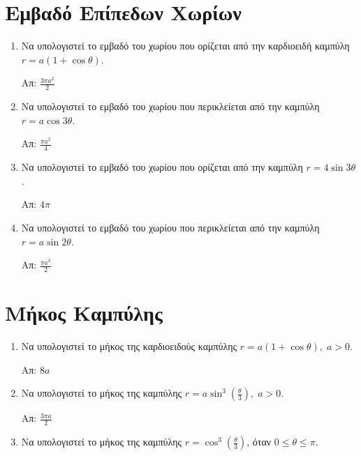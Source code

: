 


\everymath{\displaystyle}

\thispagestyle{askhseis}


\begin{center}
  \minibox{\large\bfseries \textcolor{Col1}{Πολικές Καμπύλες}}
\end{center}

\vspace{\baselineskip}


\section*{Εμβαδό Επίπεδων Χωρίων}

\begin{enumerate}
  \item Να υπολογιστεί το εμβαδό του χωρίου που ορίζεται από την καρδιοειδή καμπύλη
    $ r = a(1  + \cos{\theta}) $.

    \hfill Απ: $ \frac{3\pi a^{2}}{2} $

  \item Να υπολογιστεί το εμβαδό του χωρίου που περικλείεται από την καμπύλη $
    r = a \cos{3\theta} $.

    \hfill Απ: $ \frac{\pi a^{2}}{4} $

  \item Να υπολογιστεί το εμβαδό του χωρίου που ορίζεται από την καμπύλη 
    $ r = 4 \sin{3\theta}  $. 

    \hfill Απ: $ 4 \pi $  

  \item Να υπολογιστεί το εμβαδό του χωρίου που περικλείεται από την καμπύλη $
    r = a \sin{2\theta} $.

    \hfill Απ: $ \frac{\pi a^{2}}{2} $

\end{enumerate}



\section*{Μήκος Καμπύλης}


\begin{enumerate}
  \item Να υπολογιστεί το μήκος της καρδιοειδούς καμπύλης $ r = a(1 + \cos{\theta}), 
    \; a>0 $.

    \hfill Απ: $ 8 a $

  \item Να υπολογιστεί το μήκος της καμπύλης 
    $ r = a\sin^{3}{\left(\frac{\theta}{3}\right)}, \; a>0 $.

    \hfill Απ: $ \frac{3 \pi a}{2} $ 

  \item Να υπολογιστεί το μήκος της καμπύλης 
    $ r = \cos^{3}{\left(\frac{\theta}{3}\right)} $, όταν $ 0\leq \theta \leq \pi $.  

\end{enumerate}




